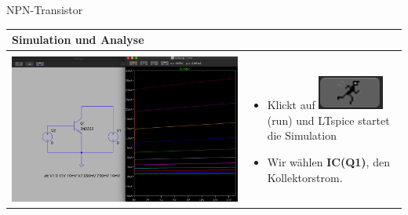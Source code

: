 \begin{frame}[t]{NPN-Transistor}

  \begin{spacing}{0.9} \begin{tiny}
      \begin{table}[h!]
        \begin{tabular}{p{5cm} p{5cm}}
          \hline
          \textbf{Simulation und Analyse} & \\
          \hline                            \\
          \begin{minipage}{.5\textwidth}
            \includegraphics[width=\linewidth]{pictures/analysis_4.png}
          \end{minipage}
                                          &
          \begin{minipage}{.5\textwidth}
            \begin{itemize}
              \item Klickt auf \includegraphics[scale=0.3]{pictures/run.png} (run) und LTspice startet die Simulation
              \item Wir wählen \textbf{IC(Q1)}, den Kollektorstrom.
            \end{itemize}
          \end{minipage}
          \\
        \end{tabular}
      \end{table}
    \end{tiny} \end{spacing}


\end{frame}
